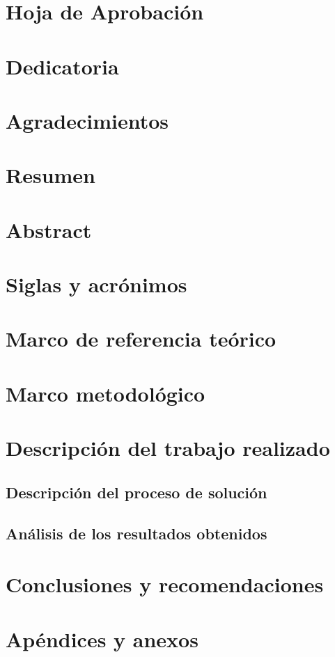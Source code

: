 \documentclass[11pt, sfdefaults=false, spanish]{scrreprt}
\begin{document}


\chapter*{Hoja de Aprobación}
\chapter*{Dedicatoria}
\chapter*{Agradecimientos}

\chapter*{Resumen}
\chapter*{Abstract}

\tableofcontents
\listoftables
\listoffigures

\chapter*{Siglas y acrónimos}



\chapter{Marco de referencia teórico}

\chapter{Marco metodológico}

\chapter{Descripción del trabajo realizado}

\section{Descripción del proceso de solución}
\section{Análisis de los resultados obtenidos}

\chapter{Conclusiones y recomendaciones}

\printbibliography

\clearpage

\chapter{Apéndices y anexos}
\end{document}
